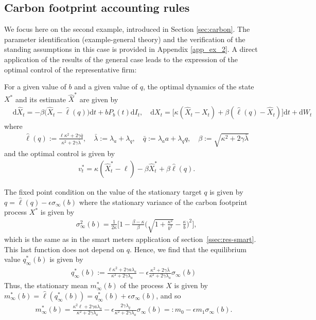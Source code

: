 \documentclass[a4paper,10pt]{article}
\newcommand{\D}{\mathrm{d}}
\theoremstyle{definition}
\theoremstyle{plain}
\numberwithin{equation}{section}
\newcommand{\hs}{\vspace{3mm}}
\begin{document}
\subsection{Carbon footprint accounting rules}\label{ssec:res-carbon}
We focus here on the second example, introduced in Section \ref{sec:carbon}. The parameter identification (example-general theory) and the verification of the standing assumptions in this case is provided in Appendix \ref{app_ex_2}.
A direct application of the results of the general case leads to the expression of the optimal control of the representative firm:

\hs

For a given value of $b$ and a given value of $q$, the optimal dynamics of the state $X ^\ast$ and its estimate $\widehat X^\ast$ are given by
\begin{align*}
&\D \widehat X_t   = - \beta \Big(\widehat X_t -  \hat\ell(q)\Big) \D t + b P_b(t) \D I_t, \quad
\D X_t  = \big[ \kappa(\widehat X_t - X_t) + \beta(\hat\ell(q) - \hat X_t)\big] \D t + \D W_t
\end{align*}
where 
\begin{align*}  
&\hat \ell(q) :=  \frac{\ell \kappa^2 + 2\gamma \bar q}{\kappa^2 + 2\gamma\bar\lambda},\quad 
    \bar\lambda := \lambda_a + \lambda_q, \quad
    \bar q := \lambda_a a + \lambda_q q, \quad
\beta := \sqrt{\kappa^2 + 2 \gamma \bar \lambda}
\end{align*}
and the optimal control is given by
  \begin{align}\label{opt_contr_energy}
&v^\ast_t =   \kappa (\widehat X_t^*- \ell) - \beta \widehat X^\ast_t + \beta \hat \ell(q).
\end{align}


 The fixed point condition on the value of the stationary target $q$ is given by $q = \hat \ell(q) - \epsilon \sigma_\infty(b)$ where the stationary variance of the carbon footprint process $X^\ast$ is given by 
\begin{align}
 & \sigma_\infty^2(b) = \frac{1}{2\kappa} \Big[1-\frac{\beta-\kappa}{\beta}\Big(\sqrt{1 + \frac{\kappa^2}{b^2}} -  \frac{\kappa}{b}\Big)^2\Big],
\end{align}
which is the same as in the smart meters application of section~\ref{ssec:res-smart}. This last function does not depend on $q$. 
Hence, we find that the equilibrium value $q_\infty^\ast(b)$ is given by
\begin{align}
q_\infty^\ast(b) := \frac{\ell\kappa^2 + 2\gamma a \lambda_a}{\kappa^2 + 2\gamma  \lambda_a}
- \epsilon \frac{\kappa^2 + 2\gamma\bar\lambda}{\kappa^2 + 2\gamma \lambda_a} \sigma_\infty(b)\end{align}
Thus, the stationary mean $m^\ast_\infty(b)$ of the process $X$ is given by $m^\ast_\infty(b) = \hat \ell(q^\ast_\infty(b)) = q^\ast_\infty(b) + \epsilon \sigma_\infty(b)$, and so
\begin{align}
	m^\ast_\infty(b)  = \frac{\kappa^2\ell + 2\gamma a \lambda_a}{\kappa^2 + 2\gamma \lambda_a } - \epsilon  \frac{2\gamma\lambda_q}{\kappa^2 + 2\gamma \lambda_a} \sigma_\infty(b)
	=: m_0 - \epsilon m_1 \sigma_\infty(b).
\end{align}
\end{document}

